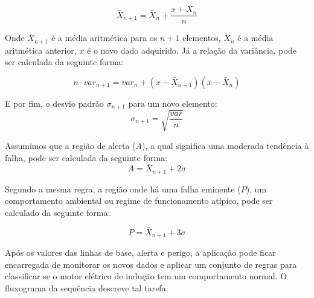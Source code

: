\begin{equation}\label{eq:ml}
    \bar{X}_{n+1} = \bar{X}_{n} + \frac{x + \bar{X}_n}{n}
\end{equation}

Onde $\bar{X}_{n+1}$ é a média aritmética para os $n+1$ elementos, $ \bar{X}_{n}$ é a média aritmética anterior,
$x$ é o novo dado adquirido. Já a relação da variância, pode ser calculada da seguinte forma:


\begin{equation}\label{eq:ml2}
    n \cdot var_{n+1} = var_{n} + (x - \bar{X}_{n+1})(x-\bar{X}_n)
\end{equation}

E por fim, o desvio padrão $\sigma_{n+1}$ para um novo elemento:
\begin{equation}\label{eq:ml3}
    \sigma_{n+1} = \sqrt{\frac{var}{n}}
\end{equation}

Assumimos que a região de alerta ($A$), a qual significa uma moderada tendência à falha, pode ser calculada da seguinte forma: 
\begin{equation}\label{eq:ml4}
    A = \bar{X}_{n+1} + 2 \sigma
\end{equation}

Segundo a mesma regra, a região onde há uma falha eminente ($P$), um comportamento ambiental ou regime de funcionamento atípico, 
pode ser calculado da seguinte forma:

\begin{equation}\label{eq:ml5}
    P = \bar{X}_{n+1} + 3 \sigma
\end{equation}

Após os valores das linhas de base, alerta e perigo, a aplicação pode ficar encarregada de monitorar os novos dados e aplicar um conjunto
de regras para classificar se o motor elétrico de indução tem um comportamento normal. O fluxograma da sequência descreve tal tarefa.

